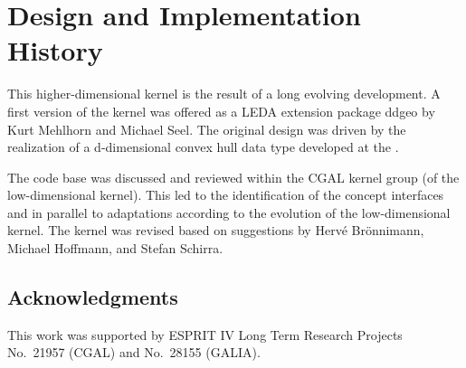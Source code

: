 \section{Design and Implementation History}

This higher-dimensional kernel is the result of a long evolving
development. A first version of the kernel was offered as a LEDA
extension package ddgeo by Kurt Mehlhorn and Michael Seel. The
original design was driven by the realization of a d-dimensional
convex hull data type developed at the 
.

The code base was discussed and reviewed within the CGAL kernel group
(of the low-dimensional kernel).  This led to the identification of
the concept interfaces and in parallel to adaptations according to the
evolution of the low-dimensional kernel.  The kernel was revised
based on suggestions by Herv\'e Br\"onnimann, Michael Hoffmann, and
Stefan Schirra.

\subsection{Acknowledgments}

This work was supported by ESPRIT IV Long Term Research Projects
No.~21957 (CGAL) and No.~28155 (GALIA).
